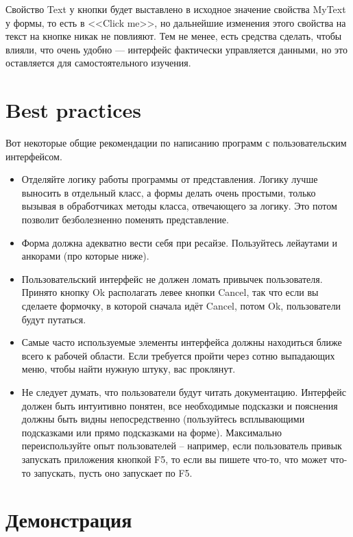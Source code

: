 \documentclass{../../text-style}
\begin{document}
Свойство Text у кнопки будет выставлено в исходное значение свойства MyText у формы, то есть в <<Click me>>, но дальнейшие изменения этого свойства на текст на кнопке никак не повлияют. Тем не менее, есть средства сделать, чтобы влияли, что очень удобно --- интерфейс фактически управляется данными, но это оставляется для самостоятельного изучения.

\section{Best practices}

Вот некоторые общие рекомендации по написанию программ с пользовательским интерфейсом.

\begin{itemize}
    \item Отделяйте логику работы программы от представления. Логику лучше выносить в отдельный класс, а формы делать очень простыми, только вызывая в обработчиках методы класса, отвечающего за логику. Это потом позволит безболезненно поменять представление.
    \item Форма должна адекватно вести себя при ресайзе. Пользуйтесь лейаутами и анкорами (про которые ниже).
    \item Пользовательский интерфейс не должен ломать привычек пользователя. Принято кнопку Ok располагать левее кнопки Cancel, так что если вы сделаете формочку, в которой сначала идёт Cancel, потом Ok, пользователи будут путаться. 
    \item Самые часто используемые элементы интерфейса должны находиться ближе всего к рабочей области. Если требуется пройти через сотню выпадающих меню, чтобы найти нужную штуку, вас проклянут.
    \item Не следует думать, что пользователи будут читать документацию. Интерфейс должен быть интуитивно понятен, все необходимые подсказки и пояснения должны быть видны непосредственно (пользуйтесь всплывающими подсказками или прямо подсказками на форме). Максимально переиспользуйте опыт пользователей – например, если пользователь привык запускать приложения кнопкой F5, то если вы пишете что-то, что может что-то запускать, пусть оно запускает по F5.
\end{itemize}

\section{Демонстрация}
\end{document}
